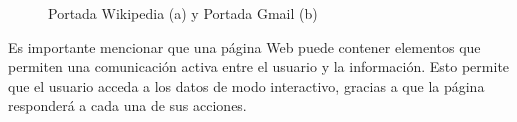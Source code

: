 \begin{figure}[!h]
\centering
{}
\caption{Portada Wikipedia (a) y Portada Gmail (b)}
\end{figure}

Es importante mencionar que una página Web puede contener elementos que
permiten una comunicación activa entre el usuario y la información. Esto permite
que el usuario acceda a los datos de modo interactivo, gracias a que la página
responderá a cada una de sus acciones.


